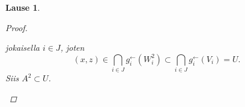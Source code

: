 \documentclass[12pt,a4paper,leqno]{report}
\theoremstyle{plain}
\newtheorem{lause}[equation]{Lause}
\theoremstyle{definition}
\theoremstyle{remark}
\begin{document}
\begin{lause}
\begin{proof}
\begin{enumerate}
jokaisella $i\in J$, joten 
\begin{equation*}
(x,z)\in \bigcap_{i\in J}g^{\leftarrow}_{i}(W_{i}^2)\subset  \bigcap_{i\in J}g^{\leftarrow}_{i}(V_{i})=U.
\end{equation*}
Siis $A^2\subset U$.
%
%
%
%
%

\end{enumerate}
\end{proof}
\end{lause}
\end{document}
